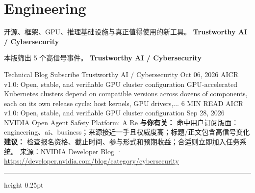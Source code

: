 \documentclass[10.5pt]{ctexart}
\begin{document}
\section*{Engineering}
{\color{ormuted} 开源、框架、GPU、推理基础设施与真正值得使用的新工具。}
\vspace{2mm}
{\LARGE\bfseries Trustworthy AI / Cybersecurity}\par
\vspace{1mm}
{\color{ormuted} 本版筛出 5 个高信号事件。}
\vspace{3mm}
{\Large\bfseries Trustworthy AI / Cybersecurity}\par
Technical Blog Subscribe Trustworthy AI / Cybersecurity Oct 06, 2026 AICR v1.0: Open, stable, and verifiable GPU cluster configuration GPU-accelerated Kubernetes clusters depend on compatible versions across dozens of components, each on its own release cycle: host kernels, GPU drivers,... 6 MIN READ AICR v1.0: Open, stable, and verifiable GPU cluster configuration Sep 28, 2026 NVIDIA Open Agent Safety Platform: A Re
\textbf{与你有关：} 命中用户订阅版面：engineering、ai、business；来源接近一手且权威度高；标题/正文包含高信号变化
\textbf{建议：} 检查报名资格、截止时间、参与形式和预期收益；合适则立即加入任务系统。
{\footnotesize\color{ormuted} 来源：NVIDIA Developer Blog · \url{https://developer.nvidia.com/blog/category/cybersecurity}}
\vspace{4mm}
\hrule height 0.25pt
\vspace{3mm}
\end{document}
